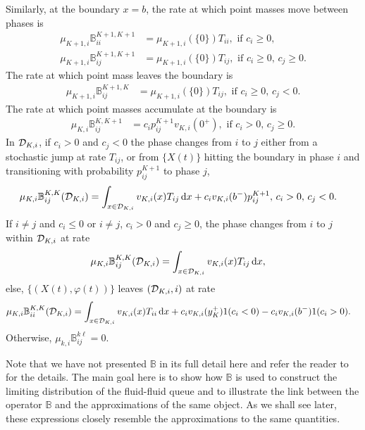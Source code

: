 Similarly, at the boundary \(x=b\), the rate at which point masses move between phases is 
\begin{align*}
	\mu_{K+1,i}\mathbb B_{ii}^{{K+1},{K+1}} &= \mu_{K+1,i}(\{0\})T_{ii}, \mbox{ if }c_i\geq 0,\,\\
	\mu_{K+1,i}\mathbb B_{ij}^{{K+1},{K+1}} &= \mu_{K+1,i}(\{0\})T_{ij},\mbox{ if }c_i\geq 0,\,c_j\geq 0.
	\end{align*}
	The rate at which point mass leaves the boundary is
	\begin{align*}
	\mu_{K+1,i}\mathbb B_{ij}^{{K+1},K} &= \mu_{K+1,i}(\{0\})T_{ij},\mbox{ if }c_i\geq 0,\,c_j<0.
	\end{align*}
	The rate at which point masses accumulate at the boundary is 
	\begin{align*}
	\mu_{K,i}\mathbb B_{ij}^{K,{K+1}} &= c_ip^{{K+1}}_{ij}v_{K,i}(0^+),\mbox{ if }c_i> 0,\,c_j\geq 0.
	\end{align*}
	In \(\mathcal{D}_{K,i}\), if \(c_i>0\) and \(c_j<0\) the phase changes from \(i\) to \(j\) either from a stochastic jump at rate \(T_{ij}\), or from \(\{X(t)\}\) hitting the boundary in phase \(i\) and transitioning with probability \(p_{ij}^{K+1}\) to phase \(j\),
	\begin{align*}
	\mu_{K,i}\mathbb B_{ij}^{K,K}(\mathcal{D}_{K,i})&=\int_{x\in\mathcal{D}_{K,i}}v_{K,i}(x)T_{ij}\, \mathrm{d} x + c_iv_{K,i}(b^-)p^{K+1}_{ij},\,c_i>0,\,c_j<0.
	\end{align*}
	If \(i\neq j\) and \(c_i\leq 0\) or \(i\neq j\), \(c_i>0\) and \(c_j\geq 0\), the phase changes from \(i\) to \(j\) within \(\mathcal{D}_{K,i}\) at rate
	\begin{align*}
	\mu_{K,i}\mathbb B_{ij}^{K,K}(\mathcal{D}_{K,i})&=\int_{x\in\mathcal{D}_{K,i}}v_{K,i}(x)T_{ij}\, \mathrm{d} x,
	\end{align*}
	else, \(\{(X(t),\varphi(t))\}\) leaves \((\mathcal{D}_{K,i},i)\) at rate
	\begin{align*}
	\mu_{K,i}\mathbb B_{ii}^{K,K}(\mathcal{D}_{K,i})&=\int_{x\in\mathcal{D}_{K,i}}v_{K,i}(x)T_{ii}\, \mathrm{d} x + c_iv_{K,i}(y_K^+)1{(c_i< 0)} - c_iv_{K,i}(b^-)1{(c_i> 0)}.
\end{align*}
Otherwise, \(\mu_{k,i}\mathbb B_{ij}^{k\ell}=0\).

Note that we have not presented \(\mathbb B\) in its full detail here and refer the reader to \citep{bo2014} for the details. The main goal here is to show how \(\mathbb B\) is used to construct the limiting distribution of the fluid-fluid queue and to illustrate the link between the operator \(\mathbb B\) and the approximations of the same object. As we shall see later, these expressions closely resemble the approximations to the same quantities. 

